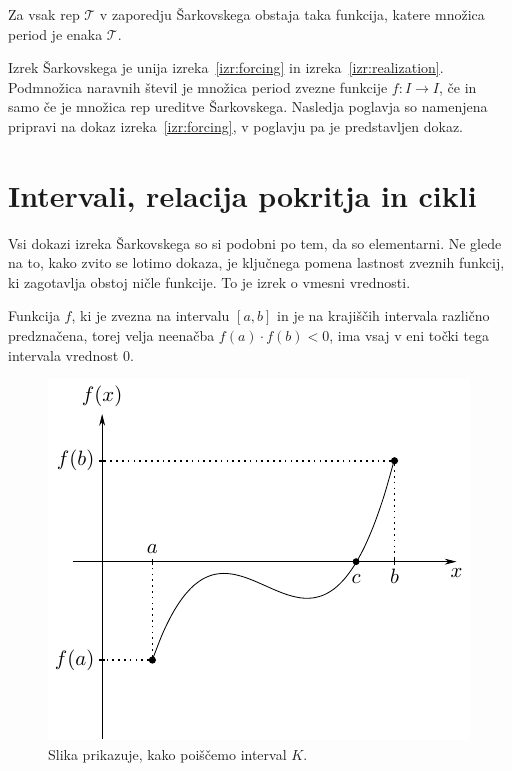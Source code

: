 \documentclass[mat2]{fmfdelo}
\begin{document}
\begin{izrek}\label{izr:realization}
Za vsak rep $\mathcal{T}$ v zaporedju Šarkovskega obstaja taka funkcija, katere množica period je enaka $\mathcal{T}$.
\end{izrek}

Izrek Šarkovskega je unija izreka~\ref{izr:forcing} in izreka~\ref{izr:realization}. Podmnožica naravnih števil je množica period zvezne funkcije $f:I \to I$, če in samo če je množica rep ureditve Šarkovskega. Nasledja poglavja so namenjena pripravi na dokaz izreka~\ref{izr:forcing}, v poglavju pa je predstavljen dokaz.
\section{Intervali, relacija pokritja in cikli}
Vsi dokazi izreka Šarkovskega so si podobni po tem, da so elementarni. Ne glede na to, kako zvito se lotimo dokaza, je ključnega pomena lastnost zveznih funkcij, ki zagotavlja obstoj ničle funkcije. To je izrek o vmesni vrednosti.

\begin{izrek}\label{izr:iovv}
Funkcija $f$, ki je zvezna na intervalu $[a, b]$ in je na krajiščih intervala različno predznačena, torej velja neenačba $f(a)\cdot f(b) < 0$, ima vsaj v eni točki tega intervala vrednost 0.
\end{izrek}

\begin{figure}[h]
  \centering
  \includegraphics[]{images/intermediate.pdf}
  \caption[Primer vektorske slike.]{Slika prikazuje, kako poiščemo interval $K$.}
  \label{fig:bezje}
\end{figure}
\end{document}
